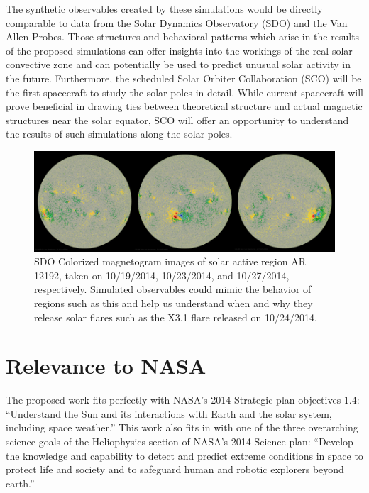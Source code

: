 \documentclass[aasms,12pt]{article}
\begin{document}
The synthetic observables created by these simulations would be directly
comparable to data from the Solar Dynamics Observatory (SDO) and the Van Allen
Probes.  Those structures and behavioral patterns which arise in the results
of the proposed simulations can offer insights into the workings of the real
solar convective zone and can potentially be used to predict unusual solar
activity in the future.  Furthermore, the scheduled Solar Orbiter Collaboration
(SCO) will be the first spacecraft to study the solar poles in detail.  While
current spacecraft will prove beneficial in drawing ties between theoretical
structure and actual magnetic structures near the solar equator, SCO will offer
an opportunity to understand the results of such simulations along the solar
poles. 

\begin{figure}[t!]
\centering
\includegraphics[width=14cm]{figs/2014_oct_sunspots.jpg}
\caption{SDO Colorized magnetogram images of solar active region AR 12192, taken
	on 10/19/2014, 10/23/2014, and 10/27/2014, respectively.  Simulated
	observables could mimic the behavior of regions such as this and help
	us understand when and why they release solar flares such as the X3.1
	flare released on 10/24/2014.
	\label{AR12192}}
\end{figure}

\section{Relevance to NASA} 
The proposed work fits perfectly with NASA's 2014 Strategic plan objectives
1.4:
``Understand the Sun and its interactions with Earth and the solar
system, including space weather.''
This work also fits in with one of the three overarching science goals
of the Heliophysics section of NASA's 2014 Science plan: 
``Develop the
knowledge and capability to detect and predict extreme conditions in space to
protect life and society and to safeguard human and robotic explorers beyond
earth.''
\end{document}
